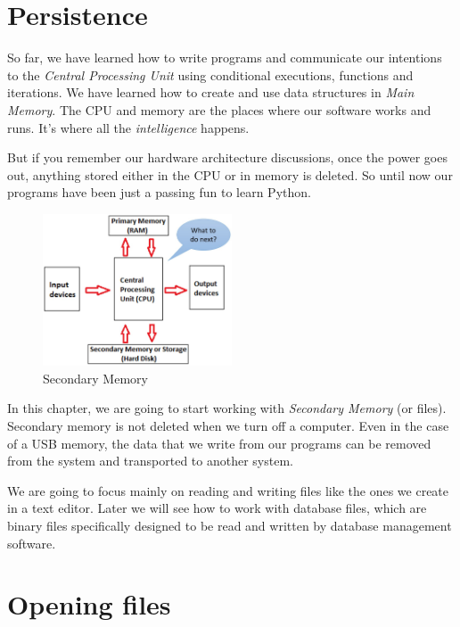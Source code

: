\hypertarget{persistencia}{%
\section{Persistence}\label{persistencia}}

 

So far, we have learned how to write programs and communicate our intentions to the \emph{Central Processing Unit} using conditional executions, functions and iterations. We have learned how to create and use data structures in \emph{Main Memory}. The CPU and memory are the places where our software works and runs. It's where all the \emph{intelligence} happens.

But if you remember our hardware architecture discussions, once the power goes out, anything stored either in the CPU or in memory is deleted. So until now our programs have been just a passing fun to learn Python. 

\begin{figure}
\centering
\includegraphics[width=0.5\textwidth]{images/sm.jpg}
\caption{Secondary Memory}
\end{figure}

In this chapter, we are going to start working with \emph{Secondary Memory} (or files). Secondary memory is not deleted when we turn off a computer. Even in the case of a USB memory, the data that we write from our programs can be removed from the system and transported to another system.

We are going to focus mainly on reading and writing files like the ones we create in a text editor. Later we will see how to work with database files, which are binary files specifically designed to be read and written by database management software.

\hypertarget{abrir-ficheros}{%
\section{Opening files}\label{abrir-ficheros}}

